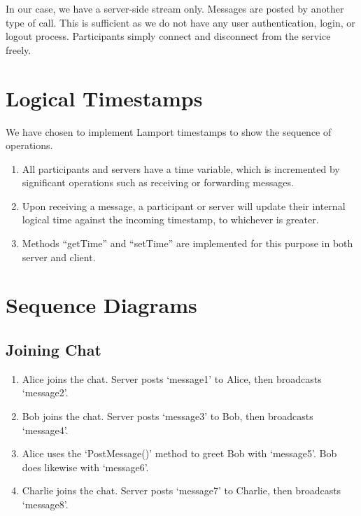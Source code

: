 \documentclass[a4paper,11pt]{article}
\begin{document}
In our case, we have a server-side stream only. Messages are posted by another type of call. This is sufficient as we do not have any user authentication, login, or logout process. Participants simply connect and disconnect from the service freely. 

\section{Logical Timestamps}
We have chosen to implement Lamport timestamps to show the sequence of operations. 

\begin{enumerate}
    \item All participants and servers have a time variable, which is incremented by significant operations such as receiving or forwarding messages. 
    \item Upon receiving a message, a participant or server will update their internal logical time against the incoming timestamp, to whichever is greater. 
    \item Methods ``getTime'' and ``setTime'' are implemented for this purpose in both server and client. 
\end{enumerate}

\section{Sequence Diagrams}

\subsection{Joining Chat}

\begin{enumerate}
    \item Alice joins the chat. Server posts `message1' to Alice, then broadcasts `message2'.
    \item Bob joins the chat. Server posts `message3' to Bob, then broadcasts `message4'.
    \item Alice uses the `PostMessage()' method to greet Bob with `message5'. Bob does likewise with `message6'. 
    \item Charlie joins the chat. Server posts `message7' to Charlie, then broadcasts `message8'.
\end{enumerate}
\end{document}

